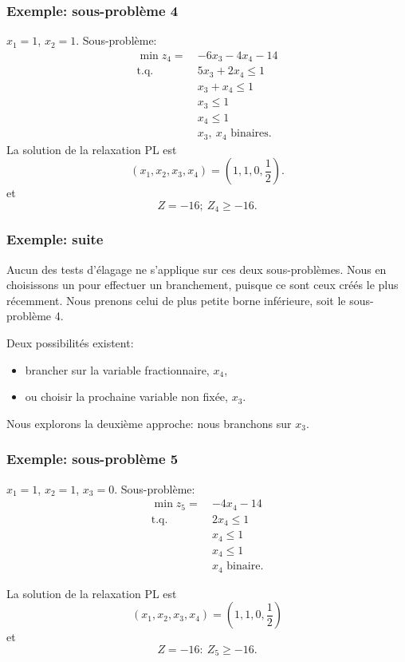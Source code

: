 \documentclass[usepdftitle=false, aspectratio=169]{beamer}
\def\st{\mbox{t.q. }}
\begin{document}
\begin{frame}
\frametitle{Exemple: sous-problème 4}

$x_1 = 1$, $x_2 = 1$. Sous-problème:
\begin{align*}
\min z_4 =\ & -6x_3 -4x_4 -14 \\
\st{} & 5 x_3 + 2x_4 \leq 1 \\
& x_3 + x_4 \leq 1 \\
& x_3 \leq 1 \\
& x_4 \leq 1 \\
& x_3,\ x_4 \mbox{ binaires}.
\end{align*}
La solution de la relaxation PL est
\[
( x_1, x_2, x_3, x_4) = \left(1,1,0, \frac{1}{2} \right).
\]
et
\[
Z = -16;\ Z_4 \geq -16.
\]

\end{frame}

\begin{frame}
\frametitle{Exemple: suite}

Aucun des tests d'élagage ne s'applique sur ces deux sous-problèmes.
Nous en choisissons un pour effectuer un branchement, puisque ce sont ceux créés le plus récemment.
Nous prenons celui de plus petite borne inférieure, soit le sous-problème 4.

\mbox{}

Deux possibilités existent:
\begin{itemize}
	\item brancher sur la variable fractionnaire, $x_4$,
	\item ou choisir la prochaine variable non fixée, $x_3$.
\end{itemize}
Nous explorons la deuxième approche: nous branchons sur $x_3$.

\end{frame}

\begin{frame}
\frametitle{Exemple: sous-problème 5}

$x_1 = 1$, $x_2 = 1$, $x_3 = 0$. Sous-problème:
\begin{align*}
\min z_5 =\ & -4x_4 - 14 \\
\st{} & 2x_4 \leq 1 \\
& x_4 \leq 1 \\
& x_4 \leq 1 \\
& x_4 \mbox{ binaire}.
\end{align*}

La solution de la relaxation PL est
\[
( x_1, x_2, x_3, x_4) = \left(1,1,0, \frac{1}{2} \right)
\]
et
\[
Z = -16:\ Z_5 \geq -16.
\]

\end{frame}
\end{document}
